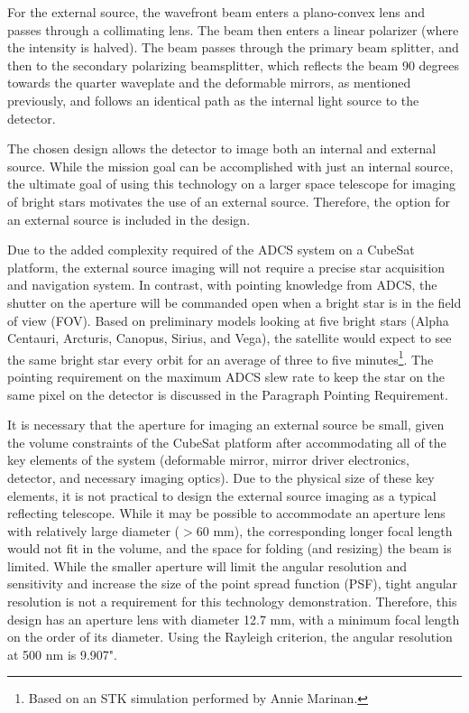 \documentclass[12pt]{article}
\begin{document}
For the external source, the wavefront beam enters a plano-convex lens and passes through a collimating lens. The beam then enters a linear polarizer (where the intensity is halved). The beam passes through the primary beam splitter, and then to the secondary polarizing beamsplitter, which reflects the beam 90 degrees towards the quarter waveplate and the deformable mirrors, as mentioned previously, and follows an identical path as the internal light source to the detector.

The chosen design allows the detector to image both an internal and external source. While the mission goal can be accomplished with just an internal source, the ultimate goal of using this technology on a larger space telescope for imaging of bright stars motivates the use of an external source. Therefore, the option for an external source is included in the design.

Due to the added complexity required of the ADCS system on a CubeSat platform, the external source imaging will not require a precise star acquisition and navigation system. In contrast, with pointing knowledge from ADCS, the shutter on the aperture will be commanded open when a bright star is in the field of view (FOV).  Based on preliminary models looking at five bright stars (Alpha Centauri, Arcturis, Canopus, Sirius, and Vega), the satellite would expect to see the same bright star every orbit for an average of three to five minutes\footnote{Based on an STK simulation performed by Annie Marinan.}.  The pointing requirement on the maximum ADCS slew rate to keep the star on the same pixel on the detector is discussed in the Paragraph Pointing Requirement.

It is necessary that the aperture for imaging an external source be small, given the volume constraints of the CubeSat platform after accommodating all of the key elements of the system (deformable mirror, mirror driver electronics, detector, and necessary imaging optics). Due to the physical size of these key elements, it is not practical to design the external source imaging as a typical reflecting telescope. While it may be possible to accommodate an aperture lens with relatively large diameter ($>60$ mm), the corresponding longer focal length would not fit in the volume, and the space for folding (and resizing) the beam is limited. While the smaller aperture will limit the angular resolution and sensitivity and increase the size of the point spread function (PSF), tight angular resolution is not a requirement for this technology demonstration. Therefore, this design has an aperture lens with diameter 12.7 mm, with a minimum focal length on the order of its diameter. Using the Rayleigh criterion, the angular resolution at 500 nm is 9.907".
\end{document}
